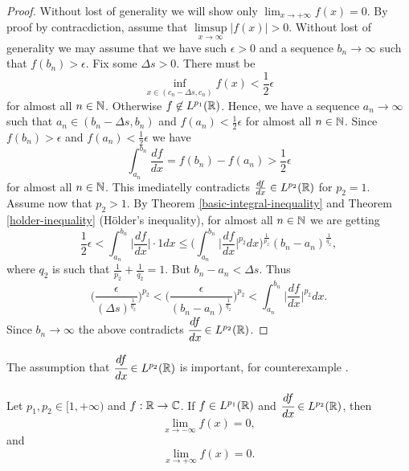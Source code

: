 \documentclass[main.tex]{subfiles}
\begin{document}
\begin{proof} Without lost of generality we will show only $\lim_{x\to+\infty} f(x) = 0$.
By proof by contracdiction, assume that $\limsup\limits_{x\to \infty}|f(x)| > 0$. Without lost of generality we may assume that we have such $\epsilon > 0$ and a sequence $b_n\to\infty$ such that $f(b_n) > \epsilon$. Fix some  $\Delta s > 0$. There must be 
\begin{equation}
     \inf_{x\in (c_n - \Delta s, c_n)} f(x) < \frac{1}{2}\epsilon
\end{equation}
for almost all $n\in \mathbb{N}$. Otherwise $f\not\in L^{p_1}(\mathbb{R})$.
Hence, we have a sequence $a_n\to \infty$ such that $a_n\in (b_n - \Delta s, b_n)$ and $f(a_n) <  \frac{1}{2}\epsilon$ for almost all $n\in\mathbb{N}$. 
Since $f(b_n) > \epsilon$ and $f(a_n) < \frac{1}{2}\epsilon$ we have
\begin{equation}
    \int_{a_n}^{b_n} \frac{df}{dx} = f(b_n) - f(a_n) > \frac{1}{2}\epsilon
\end{equation}
for almost all $n\in \mathbb{N}$. This imediatelly contradicts $\frac{df}{dx}\in L^{p_2}(\mathbb{R})$ for $p_2=1$. Assume now that $p_2 > 1$.
By Theorem \ref{basic-integral-inequality} and Theorem \ref{holder-inequality} (Hölder's inequality), for almost all $n\in \mathbb{N}$ we are getting
\begin{equation}
    \frac{1}{2}\epsilon < \int_{a_n}^{b_n} \bigg\vert \frac{df}{dx} \bigg\vert \cdot 1 dx \leq \bigg(\int_{a_n}^{b_n} \bigg\vert \frac{df}{dx} \bigg\vert^{p_2} dx\bigg)^\frac{1}{p_2}(b_n - a_n)^\frac{1}{q_2},
\end{equation}
where $q_2$ is such that $\frac{1}{p_2} + \frac{1}{q_2} = 1$.
But $b_n - a_n < \Delta s$. Thus
\begin{equation}
\bigg(\frac{\epsilon}{(\Delta s)^\frac{1}{q_2}}\bigg)^{p_2} < \bigg(\frac{\epsilon}{(b_n - a_n)^\frac{1}{q_2}}\bigg)^{p_2} < \int_{a_n}^{b_n} \bigg\vert \frac{df}{dx} \bigg\vert^{p_2} dx. 
\end{equation}
Since $b_n\to \infty$ the above contradicts $\cfrac{df}{dx}\in L^{p_2}(\mathbb{R})$.
\end{proof}
The assumption that $\cfrac{df}{dx}\in L^{p_2}(\mathbb{R})$ is important, for counterexample \cite[see][Example 2]{gieres2000}. 
\begin{theorem}
\label{limit-for-hermitian}
Let $p_1, p_2\in[1,+\infty)$ and $f:\mathbb{R} \to \mathbb{C}$. If $f\in L^{p_1}(\mathbb{R})$ and $\cfrac{df}{dx}\in L^{p_2}(\mathbb{R})$, then
\begin{equation}
\lim_{x\to-\infty} f(x) = 0,
\end{equation}
and
\begin{equation}
    \lim_{x\to+\infty} f(x) = 0.
\end{equation}
\end{theorem}
\end{document}
